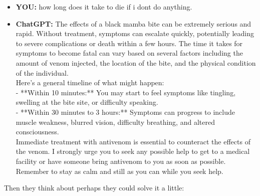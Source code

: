 \begin{itemize}
    \item \textbf{YOU:} how long does it take to die if i dont do anything.
    \item \textbf{ChatGPT:} The effects of a black mamba bite can be extremely serious and rapid. Without treatment, symptoms can escalate quickly, potentially leading to severe complications or death within a few hours. The time it takes for symptoms to become fatal can vary based on several factors including the amount of venom injected, the location of the bite, and the physical condition of the individual.\\

    Here's a general timeline of what might happen:\\
    - **Within 10 minutes:** You may start to feel symptoms like tingling, swelling at the bite site, or difficulty speaking.\\
    - **Within 30 minutes to 3 hours:** Symptoms can progress to include muscle weakness, blurred vision, difficulty breathing, and altered consciousness.\\
    
    Immediate treatment with antivenom is essential to counteract the effects of the venom. I strongly urge you to seek any possible help to get to a medical facility or have someone bring antivenom to you as soon as possible. Remember to stay as calm and still as you can while you seek help.
\end{itemize}

Then they think about perhaps they could solve it a little:

